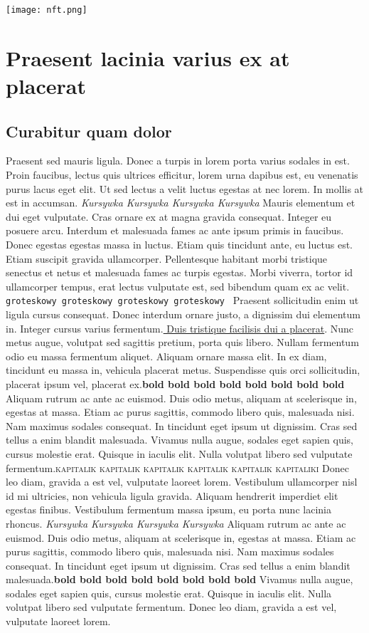 \documentclass[12pt,a4paper]{article}
\begin{document}
\begin{center}
\texttt{[image: nft.png]}
\cite{greenwade93}
\end{center}

\section{Praesent lacinia varius ex at placerat}

\subsection{Curabitur quam dolor}
Praesent sed mauris ligula. Donec a turpis in lorem porta varius sodales in est. Proin faucibus, lectus quis ultrices efficitur, lorem urna dapibus est, eu venenatis purus lacus eget elit. Ut sed lectus a velit luctus egestas at nec lorem. In mollis at est in accumsan. \textit{Kursywka Kursywka Kursywka Kursywka} Mauris elementum et dui eget vulputate. Cras ornare ex at magna gravida consequat. Integer eu posuere arcu. Interdum et malesuada fames ac ante ipsum primis in faucibus. Donec egestas egestas massa in luctus. Etiam quis tincidunt ante, eu luctus est. Etiam suscipit gravida ullamcorper. Pellentesque habitant morbi tristique senectus et netus et malesuada fames ac turpis egestas. Morbi viverra, tortor id ullamcorper tempus, erat lectus vulputate est, sed bibendum quam ex ac velit. \texttt{groteskowy groteskowy groteskowy groteskowy } Praesent sollicitudin enim ut ligula cursus consequat. Donec interdum ornare justo, a dignissim dui elementum in. Integer cursus varius fermentum.\underline{ Duis tristique facilisis dui a placerat}. Nunc metus augue, volutpat sed sagittis pretium, porta quis libero. Nullam fermentum odio eu massa fermentum aliquet. Aliquam ornare massa elit. In ex diam, tincidunt eu massa in, vehicula placerat metus. Suspendisse quis orci sollicitudin, placerat ipsum vel, placerat ex.\textbf{bold bold bold bold bold bold bold bold}  Aliquam rutrum ac ante ac euismod. Duis odio metus, aliquam at scelerisque in, egestas at massa. Etiam ac purus sagittis, commodo libero quis, malesuada nisi. Nam maximus sodales consequat. In tincidunt eget ipsum ut dignissim. Cras sed tellus a enim blandit malesuada. Vivamus nulla augue, sodales eget sapien quis, cursus molestie erat. Quisque in iaculis elit. Nulla volutpat libero sed vulputate fermentum.\textsc{kapitalik kapitalik kapitalik kapitalik kapitalik kapitaliki}  Donec leo diam, gravida a est vel, vulputate laoreet lorem. Vestibulum ullamcorper nisl id mi ultricies, non vehicula ligula gravida. Aliquam hendrerit imperdiet elit egestas finibus. Vestibulum fermentum massa ipsum, eu porta nunc lacinia rhoncus. \textit{Kursywka Kursywka Kursywka Kursywka} Aliquam rutrum ac ante ac euismod. Duis odio metus, aliquam at scelerisque in, egestas at massa. Etiam ac purus sagittis, commodo libero quis, malesuada nisi. Nam maximus sodales consequat. In tincidunt eget ipsum ut dignissim. Cras sed tellus a enim blandit malesuada.\textbf{bold bold bold bold bold bold bold bold}  Vivamus nulla augue, sodales eget sapien quis, cursus molestie erat. Quisque in iaculis elit. Nulla volutpat libero sed vulputate fermentum. Donec leo diam, gravida a est vel, vulputate laoreet lorem.
\end{document}
